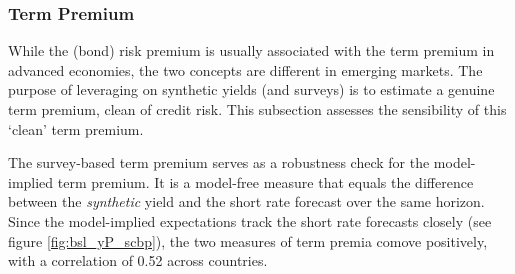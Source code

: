 {%

\subsubsection{Term Premium} \label{sec:TP}
\iftoggle{toclinks}{\gototoc}{} %

While the (bond) risk premium is usually associated with the term premium in advanced economies, the two concepts are different in emerging markets.
The purpose of leveraging on synthetic yields (and surveys) is to estimate a genuine term premium, clean of credit risk.
This subsection assesses the sensibility of this `clean' term premium.

The survey-based term premium serves as a robustness check for the model-implied term premium.
It is a model-free measure that equals the difference between the \textit{synthetic} yield and the short rate forecast over the same horizon.
Since the model-implied expectations track the short rate forecasts closely (see figure \ref{fig:bsl_yP_scbp}), the two measures of term premia comove positively, with a correlation of 0.52 across countries.

}
